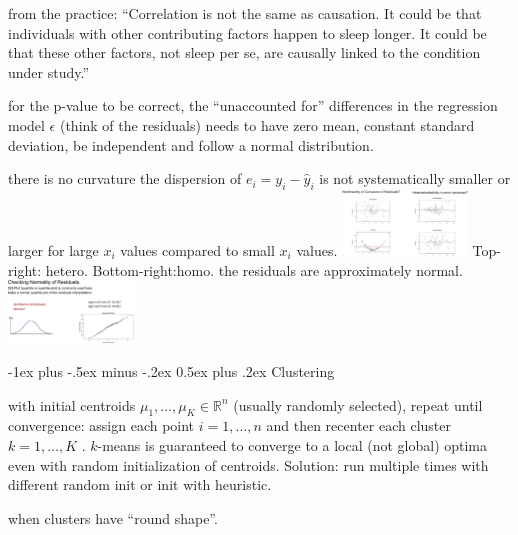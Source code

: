 \documentclass[10pt,landscape]{article}
\makeatletter
\renewcommand{\section}{\@startsection{section}{1}{0mm}%
                                {-1ex plus -.5ex minus -.2ex}%
                                {0.5ex plus .2ex}%
                                {\normalfont\large\bfseries}}
\newcommand{\Blue}[1]{\noindent{\textbf{\textcolor{Blue}{#1 -}}}}
\newcommand{\Red}[1]{\noindent{\textbf{\textcolor{BrickRed}{#1 -}}}}
\newcommand{\Green}[1]{\noindent{\textbf{\textcolor{PineGreen}{#1 -}}}}
\makeatother
\begin{document}
\begin{multicols}{4}
\Blue{Inferring model's coefficient} from the practice: ``Correlation is not the same as causation. It could be that
individuals with other contributing factors happen to sleep longer. It could be that these other factors, not sleep per
se, are causally linked to the condition under study.''

\Red{Technical caution} for the p-value to be correct, the ``unaccounted for'' differences in the regression model
$\epsilon$ (think of the residuals) needs to have zero mean, constant standard deviation, be independent and follow a normal distribution.

\Green{Linearity} there is no curvature
\Green{Homoskedasticity} the dispersion of $e_i = y_i - \hat{y}_i$ is not systematically smaller or larger for large
$x_i$ values compared to small $x_i$ values.
\includegraphics[width=0.25\textwidth]{residuals1.jpg}
Top-right: hetero. Bottom-right:homo.
\Green{Normality} the residuals are approximately normal.
\includegraphics[width=0.25\textwidth]{residuals2.jpg}

\section{Clustering}

\Blue{$k$-means} with initial centroids $\mu_1,\dots,\mu_K \in \mathbb{R}^n$ (usually randomly selected),
repeat until convergence:
assign each point $i=1,\dots,n$ 
and then recenter each cluster $k=1,\dots,K$
.
$k$-means is guaranteed to converge to a local (not global) optima even with
random initialization of centroids. Solution: run multiple times with different
random init or init with heuristic.

\Green{$k$-means objective func}

\Green{Works the best} when clusters have ``round shape''.


\end{multicols}
\end{document}
